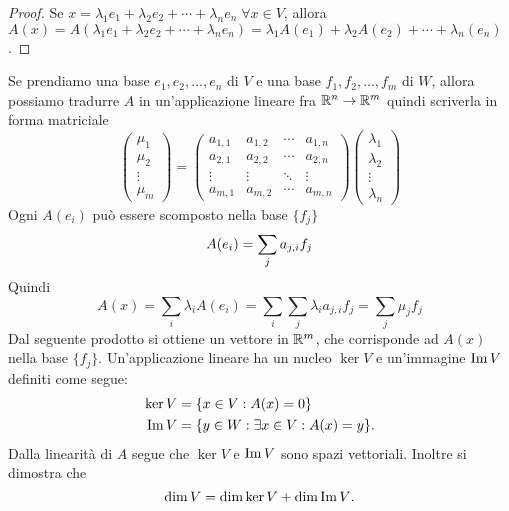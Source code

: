 \begin{proof}
Se $x = \lambda_1 e_1 + \lambda_2 e_2 + \cdots + \lambda_n e_n \; \forall x \in V$, allora $A(x) = A(\lambda_1 e_1 + \lambda_2 e_2 + \cdots + \lambda_n e_n) = \lambda_1 A(e_1) + \lambda_2 A(e_2) + \cdots + \lambda_n (e_n)$.
\end{proof} 
Se prendiamo una base $e_1, e_2, \ldots, e_n$ di $V$ e una base $f_1, f_2, \ldots, f_m$ di $W$, allora possiamo tradurre $A$ in un'applicazione lineare fra $\mathbb R^n \rightarrow \mathbb R^m$ quindi scriverla in forma matriciale
\begin{equation*}
\begin{pmatrix}
\mu_1 \\
\mu_2 \\
\vdots \\
\mu_m
\end{pmatrix}
=
\begin{pmatrix}
a_{1,1} & a_{1,2} & \cdots & a_{1,n} \\
a_{2,1} & a_{2,2} & \cdots & a_{2,n} \\
\vdots  & \vdots  & \ddots & \vdots  \\
a_{m,1} & a_{m,2} & \cdots & a_{m,n}
\end{pmatrix}
\begin{pmatrix}
\lambda_1 \\
\lambda_2 \\
\vdots \\
\lambda_n
\end{pmatrix}
\end{equation*}
Ogni $A(e_i)$ può essere scomposto nella base $\{f_j\}$
\begin{equation*}
A(e_i) = \sum_j{a_{j,i} f_j} \\
\end{equation*}
Quindi
\begin{equation*}
A(x) = \sum_i{\lambda_i A(e_i)} = \sum_i\sum_j{\lambda_i a_{j,i} f_j} = \sum_j{\mu_j f_j}
\end{equation*}
Dal seguente prodotto si ottiene un vettore in $\mathbb R^m$, che corrisponde ad $A(x)$ nella base $\{f_j\}$. Un'applicazione lineare ha un nucleo $\ker{V}$ e un'immagine $\operatorname{Im}{V}$ definiti come segue:
\begin{align*}
\ker{V} &= \{x \in V : A(x) = 0\}\\
\operatorname{Im}{V} &= \{y \in W : \exists x \in V : A(x) = y\}.
\end{align*}
Dalla linearità di $A$ segue che $\ker{V}$ e $\operatorname{Im}{V}$ sono spazi vettoriali. Inoltre si dimostra che 
\begin{equation}
\dim{V} = \dim{\ker{V}} + \dim{\operatorname{Im}{V}}.
\end{equation}

